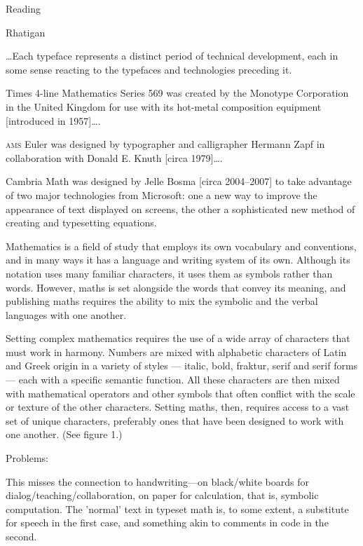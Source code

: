 \documentclass[11pt]{PalisadesLakesBook}
\begin{document}
\begin{plSection}{Reading}
\begin{plSection}{Rhatigan}
\begin{plSection}{}
\begin{plQuote}{}{}
{\ldots}Each typeface represents a distinct period of technical
development, each in some sense reacting to the typefaces 
and technologies preceding it.

Times 4-line Mathematics Series 569 was created by the Monotype
Corporation in the United Kingdom for use with its hot-metal
composition equipment [introduced in 1957]{\ldots}.

\textsc{ams} Euler was designed by typographer and
calligrapher Hermann Zapf in collaboration with Donald E. Knuth
[circa 1979]{\ldots}.

Cambria Math was designed by Jelle Bosma [circa 2004--2007]
to take advantage of two major technologies from Microsoft: 
one a new way to improve the appearance of text 
displayed on screens, 
the other a sophisticated new method 
of creating and typesetting equations.
\end{plQuote}

\begin{plQuote}{}{}
Mathematics is a field of study that employs its own vocabulary 
and conventions, and in many ways it has a language 
and writing system of its own. 
Although its notation uses many familiar characters, 
it uses them as symbols rather than words. 
However, maths is set alongside the words that convey its meaning, 
and publishing maths requires the ability to mix the symbolic 
and the verbal languages with one another.

Setting complex mathematics requires the use of a wide array 
of characters that must work in harmony. 
Numbers are mixed with alphabetic characters 
of Latin and Greek origin in a variety of styles — 
italic, bold, fraktur, serif and serif forms — 
each with a specific semantic function. 
All these characters are then mixed 
with mathematical operators and other symbols 
that often conflict with the scale or texture 
of the other characters. 
Setting maths, then, requires access to a vast set 
of unique characters, preferably ones 
that have been designed to work with one another. 
(See figure 1.)
\end{plQuote}

Problems:

This misses the connection to handwriting---on black/white boards
for dialog/teaching/collaboration, on paper for calculation, 
that is, symbolic computation.
The 'normal' text in typeset math
is, to some extent, a substitute for speech in the first case,
and something akin to comments in code in the second.


\end{plSection}
\end{plSection}
\end{plSection}
\end{document}
